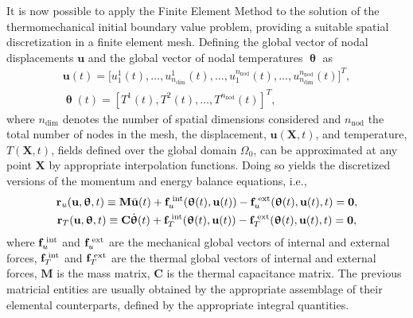 It is now possible to apply the Finite Element Method to the solution of the thermomechanical initial boundary value problem, providing a suitable spatial discretization in a finite element mesh.
Defining the global vector of nodal displacements \(\mathbf{u}\) and the global vector of nodal temperatures \(\bm{\uptheta}\) as
\begin{gather}
  \mathbf{u}(t) = \Big[ u_1^1(t),\dots,u^1_{n_\text{dim}}(t),\dots, u_1^{n_\text{nod}}(t),\dots,u^{n_\text{nod}}_{n_\text{dim}}(t)\Big]^T,\\
  \bm{\uptheta}(t) = \left[ T^1(t), T^2(t), \dots, T^{n_\text{nod}}(t)\right]^T,
\end{gather}
where \(n_\text{dim}\) denotes the number of spatial dimensions considered and \(n_\text{nod}\) the total number of nodes in the mesh, the displacement, $\bm{u}(\bm{X}, t)$, and temperature, \(T(\bm{X}, t)\), fields defined over the global domain $\Omega_0$, can be approximated at any point $\bm{X}$ by appropriate interpolation functions.
Doing so yields the discretized versions of the momentum and energy balance equations, i.e.,
\begin{gather}
  \mathbf{r}_{u}(\mathbf{u}, \bm{\uptheta}, t)\equiv\mathbf{M} \ddot{\mathbf{u}}(t) +\mathbf{f}_u^\text{\;int}(\bm{\uptheta}(t), \mathbf{u}(t))-\mathbf{f}^\text{\;ext}_{u}(\bm{\uptheta}(t), \mathbf{u}(t), t)=\mathbf{0}, \label{eq:disc_momentum_balance} \\
  \mathbf{r}_{T}(\mathbf{u}, \bm{\uptheta}, t)\equiv \mathbf{C} \dot{\bm{\uptheta}}(t)  + \mathbf{f}_T^\text{\;int}(\bm{\uptheta}(t), \mathbf{u}(t))-\mathbf{f}^\text{\;ext}_{T}(\bm{\uptheta}(t), \mathbf{u}(t), t)=\mathbf{0}, \label{eq:disc_energy_balance}
\end{gather}
where $\mathbf{f}_u^\text{\;int}$ and $\mathbf{f}^\text{\;ext}_{u}$ are the mechanical global vectors of internal and external forces, $\mathbf{f}_T^\text{\;int}$ and $\mathbf{f}^\text{\;ext}_{T}$ are the thermal global vectors of internal and external forces, $\mathbf{M}$ is the mass matrix, \(\mathbf{C}\) is the thermal capacitance matrix.
The previous matricial entities are usually obtained by the appropriate assemblage of their elemental counterparts, defined by the appropriate integral quantities.

